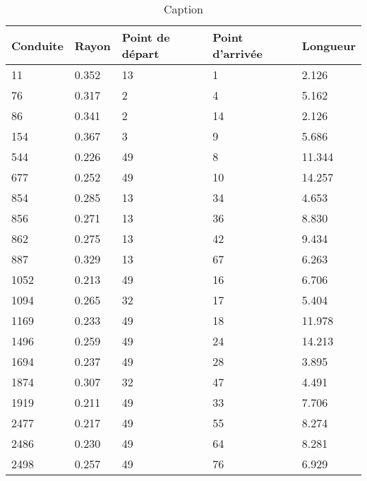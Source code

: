 \begin{table}[h]
  \centering
  \begin{tabular}{|l|l|l|l|l|}
      \hline
      \textbf{Conduite} & \textbf{Rayon} & \textbf{Point de départ} & \textbf{Point d'arrivée} & \textbf{Longueur} \\
      \hline
      11   & 0.352 & 13 & 1  & 2.126  \\ \hline
      76   & 0.317 & 2  & 4  & 5.162  \\ \hline
      86   & 0.341 & 2  & 14 & 2.126  \\ \hline
      154  & 0.367 & 3  & 9  & 5.686  \\ \hline
      544  & 0.226 & 49 & 8  & 11.344 \\ \hline
      677  & 0.252 & 49 & 10 & 14.257 \\ \hline
      854  & 0.285 & 13 & 34 & 4.653  \\ \hline
      856  & 0.271 & 13 & 36 & 8.830  \\ \hline
      862  & 0.275 & 13 & 42 & 9.434  \\ \hline
      887  & 0.329 & 13 & 67 & 6.263  \\ \hline
      1052 & 0.213 & 49 & 16 & 6.706  \\ \hline
      1094 & 0.265 & 32 & 17 & 5.404  \\ \hline
      1169 & 0.233 & 49 & 18 & 11.978 \\ \hline
      1496 & 0.259 & 49 & 24 & 14.213 \\ \hline
      1694 & 0.237 & 49 & 28 & 3.895  \\ \hline
      1874 & 0.307 & 32 & 47 & 4.491  \\ \hline
      1919 & 0.211 & 49 & 33 & 7.706  \\ \hline
      2477 & 0.217 & 49 & 55 & 8.274  \\ \hline
      2486 & 0.230 & 49 & 64 & 8.281  \\ \hline
      2498 & 0.257 & 49 & 76 & 6.929  \\ \hline
  \end{tabular}
  \caption{Caption}
  \label{tab:my_label}
\end{table}


